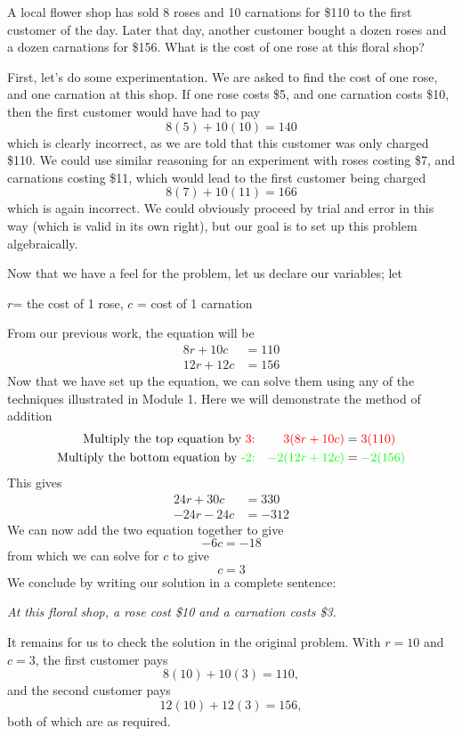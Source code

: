 \begin{myexample}
A local flower shop has sold 8 roses and 10 carnations for \$110 to the first customer of the day. Later that day, another customer bought a dozen roses and a dozen carnations for \$156. What is the cost of one rose at this floral shop?
\end{myexample}
\begin{myProof}
	First, let's do some experimentation. We are asked to find the cost of one rose, and one carnation at this shop. If one rose costs \$5, and one carnation costs \$10, then the first customer would have had to pay
	\[
		8(5)+10(10)=140
	\]
	which is clearly incorrect, as we are told that this customer was only charged \$110. We could use similar reasoning for an experiment with roses costing \$7, and carnations costing \$11, which would lead to the first customer being charged
	\[
		8(7)+10(11) = 166
	\]
	which is again incorrect. We could obviously proceed by trial and error in this way (which is valid in its own right), but our goal is to set up this problem algebraically.
		
	Now that we have a feel for the problem, let us declare our variables; let
	\begin{tightcenter}
		$r$= the cost of 1 rose, $c$ = cost of 1 carnation
	\end{tightcenter}
	From our previous work, the equation will be
	\begin{align*}
		8r + 10c & =		110 \\
		12r +12c & =		156 
	\end{align*}
	Now that we have set up the equation, we can solve them using any of the techniques illustrated in Module 1. Here we will demonstrate the method of addition
	\begin{alignat*}{2}
		\text{Multiply the top equation by 	\color{red}{3}:}      &   & \color{red}{3}(8r+10c)     & = \color{red}{3}(110)     \\
		\text{Multiply the bottom equation by \color{green}{-2}:} &   & \color{green}{-2}(12r+12c) & =  \color{green}{-2}(156) 
	\end{alignat*}
	This gives
	\begin{align*}
		24r+30c  & =		330  \\
		-24r-24c & =		-312 
	\end{align*}
	We can now add the two equation together to give
	\[
		-6c=-18
	\]
	from which we can solve for $c$ to give
	\[
		c=3
	\]
	We conclude by writing our \gls{solution} in a complete sentence:
	\begin{tightcenter}
		{\em At this floral shop, a rose cost \$10 and a carnation costs \$3.}
	\end{tightcenter}
	It remains for us to check the solution in the original problem. With $r=10$ and $c=3$, the first
	customer pays
	\[
		8(10)+10(3)=110,
	\]
	and the second customer pays
	\[
		12(10)+12(3)=156,
	\]
	both of which are as required.
\end{myProof}

